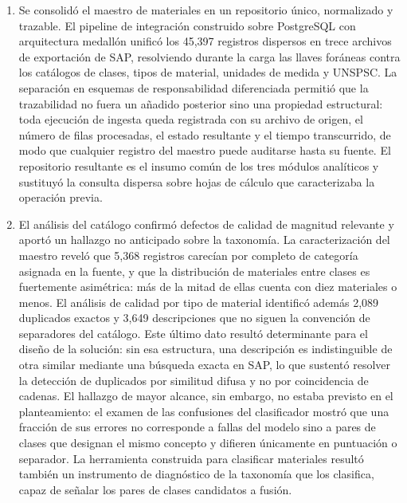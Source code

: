 \begin{enumerate}
	\item Se consolidó el maestro de materiales en un repositorio único, normalizado y trazable. El pipeline de integración construido sobre PostgreSQL con arquitectura medallón unificó los 45,397 registros dispersos en trece archivos de exportación de SAP, resolviendo durante la carga las llaves foráneas contra los catálogos de clases, tipos de material, unidades de medida y UNSPSC. La separación en esquemas de responsabilidad diferenciada permitió que la trazabilidad no fuera un añadido posterior sino una propiedad estructural: toda ejecución de ingesta queda registrada con su archivo de origen, el número de filas procesadas, el estado resultante y el tiempo transcurrido, de modo que cualquier registro del maestro puede auditarse hasta su fuente. El repositorio resultante es el insumo común de los tres módulos analíticos y sustituyó la consulta dispersa sobre hojas de cálculo que caracterizaba la operación previa.

	\item El análisis del catálogo confirmó defectos de calidad de magnitud relevante y aportó un hallazgo no anticipado sobre la taxonomía. La caracterización del maestro reveló que 5,368 registros carecían por completo de categoría asignada en la fuente, y que la distribución de materiales entre clases es fuertemente asimétrica: más de la mitad de ellas cuenta con diez materiales o menos. El análisis de calidad por tipo de material identificó además 2,089 duplicados exactos y 3,649 descripciones que no siguen la convención de separadores del catálogo. Este último dato resultó determinante para el diseño de la solución: sin esa estructura, una descripción es indistinguible de otra similar mediante una búsqueda exacta en SAP, lo que sustentó resolver la detección de duplicados por similitud difusa y no por coincidencia de cadenas. El hallazgo de mayor alcance, sin embargo, no estaba previsto en el planteamiento: el examen de las confusiones del clasificador mostró que una fracción de sus errores no corresponde a fallas del modelo sino a pares de clases que designan el mismo concepto y difieren únicamente en puntuación o separador. La herramienta construida para clasificar materiales resultó también un instrumento de diagnóstico de la taxonomía que los clasifica, capaz de señalar los pares de clases candidatos a fusión.


\end{enumerate}
